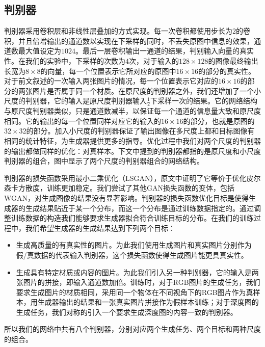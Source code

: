 \documentclass[UTF8,openany,AutoFakeBold,AutoFakeSlant,cs4size]{ctexbook}
\begin{document}
\subsection{判别器}

判别器采用卷积层和非线性层叠加的方式实现。每一次卷积都使用步长为$2$的卷积，并且倍增输出的通道数以实现在下采样的同时，不丢失原图中信息的效果，通道数最大值设定为$1024$。最后一层卷积输出一通道的结果，判别输入向量的真实性。在我们的实验中，下采样的次数为$4$次，对于输入的$128 \times 128$的图像最终输出长宽为$8\times8$的向量，每一个位置表示它所对应的原图中$16\times16$的部分的真实性。对于前文叙述的一次输入两张图片的情况，每一个位置表示它对应的$16\times16$的部分的两张图片是否属于同一个材质。在原尺度的判别器之外，我们还增加了一个小尺度的判别器，它的输入是原尺度判别器输入$\frac{1}{2}$下采样一次的结果。它的网络结构与原尺度判别器类似，只是通道数减半，以保证每一个通道的信息量大致和原尺度相同。它的输出的每一个位置同样对应它的输入的$16\times16$的部分，也就是原图的$32\times32$的部分。加入小尺度的判别器保证了输出图像在多尺度上都和目标图像有相同的统计特征，为生成器提供更多的指导。优化过程中我们对两个尺度的判别器的输出都做同样的优化：对真样本。下文中提到的判别器都指的是原尺度和小尺度判别器的组合，图中显示了两个尺度的判别器组合的网络结构。

判别器的损失函数采用最小二乘优化（LSGAN），原文中证明了它等价于优化皮尔森卡方散度，训练更加稳定。我们尝试了其他GAN损失函数的变体，包括WGAN，对生成图像的结果没有显著影响。判别器的损失函数优化目标是使得生成器的生成结果贴近于某一个分布，而这一个分布是通过训练数据指定的。通过调整训练数据的构造我们能够要求生成器拟合符合训练目标的分布。在我们的训练过程中，我们希望生成器的生成结果达到下列两个目标：

\begin{itemize}
	\item 生成高质量的有真实性的图片。为此我们使用生成图片和真实图片分别作为假/真数据的代表输入判别器，这个损失函数使得生成图片能更具真实性。
	\item 生成具有特定材质或内容的图片。为此我们引入另一种判别器，它的输入是两张图片的拼接，即输入通道数加倍。训练时，对于RGB图片的生成任务，我们要求生成图片的材质相同，采用同一个物体在不同视角下的RGB图片作为真样本，用生成器输出的结果和一张真实图片拼接作为假样本训练；对于深度图的生成任务，我们对称的引入一个要求生成深度图的内容一致的判别器。
\end{itemize}

所以我们的网络中共有八个判别器，分别对应两个生成任务、两个目标和两种尺度的组合。
\end{document}
